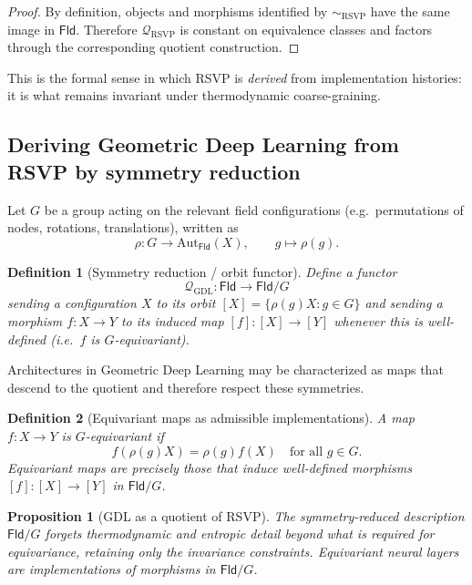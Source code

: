 \documentclass[11pt]{article}
\newtheorem{definition}{Definition}
\newtheorem{proposition}{Proposition}
\begin{document}
\begin{proof}
By definition, objects and morphisms identified by $\sim_{\mathrm{RSVP}}$ have
the same image in $\mathsf{Fld}$. Therefore $\mathcal{Q}_{\mathrm{RSVP}}$ is
constant on equivalence classes and factors through the corresponding quotient
construction.
\end{proof}

This is the formal sense in which RSVP is \emph{derived} from implementation
histories: it is what remains invariant under thermodynamic coarse-graining.

\subsection{Deriving Geometric Deep Learning from RSVP by symmetry reduction}

Let $G$ be a group acting on the relevant field configurations (e.g.\ permutations
of nodes, rotations, translations), written as
\[
\rho : G \to \mathrm{Aut}_{\mathsf{Fld}}(X), \qquad g \mapsto \rho(g).
\]

\begin{definition}[Symmetry reduction / orbit functor]
Define a functor
\[
\mathcal{Q}_{\mathrm{GDL}} : \mathsf{Fld} \to \mathsf{Fld}/G
\]
sending a configuration $X$ to its orbit $[X]=\{ \rho(g)X : g\in G\}$ and sending
a morphism $f:X\to Y$ to its induced map $[f]:[X]\to [Y]$ whenever this is
well-defined (i.e.\ $f$ is $G$-equivariant).
\end{definition}

Architectures in Geometric Deep Learning may be characterized as maps that
descend to the quotient and therefore respect these symmetries.

\begin{definition}[Equivariant maps as admissible implementations]
A map $f:X\to Y$ is \emph{$G$-equivariant} if
\[
f(\rho(g)X)=\rho(g)f(X)\quad \text{for all }g\in G.
\]
Equivariant maps are precisely those that induce well-defined morphisms
$[f]:[X]\to[Y]$ in $\mathsf{Fld}/G$.
\end{definition}

\begin{proposition}[GDL as a quotient of RSVP]
The symmetry-reduced description $\mathsf{Fld}/G$ forgets thermodynamic and
entropic detail beyond what is required for equivariance, retaining only the
invariance constraints. Equivariant neural layers are implementations of
morphisms in $\mathsf{Fld}/G$.
\end{proposition}
\end{document}
